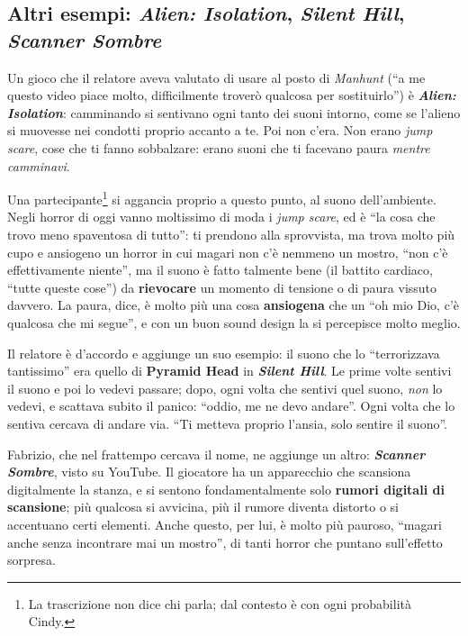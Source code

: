 \subsection{Altri esempi: \emph{Alien: Isolation}, \emph{Silent Hill},
\emph{Scanner Sombre}}

Un gioco che il relatore aveva valutato di usare al posto di \emph{Manhunt} (``a
me questo video piace molto, difficilmente troverò qualcosa per sostituirlo'') è
\textbf{\emph{Alien: Isolation}}: camminando si sentivano ogni tanto dei suoni
intorno, come se l'alieno si muovesse nei condotti proprio accanto a te. Poi non
c'era. Non erano \emph{jump scare}, cose che ti fanno sobbalzare: erano suoni
che ti facevano paura \emph{mentre camminavi}.

Una partecipante\footnote{La trascrizione non dice chi parla; dal contesto è con
ogni probabilità Cindy.} si aggancia proprio a questo punto, al suono
dell'ambiente. Negli horror di oggi vanno moltissimo di moda i \emph{jump scare},
ed è ``la cosa che trovo meno spaventosa di tutto'': ti prendono alla sprovvista,
ma trova molto più cupo e ansiogeno un horror in cui magari non c'è nemmeno un
mostro, ``non c'è effettivamente niente'', ma il suono è fatto talmente bene
(il battito cardiaco, ``tutte queste cose'') da \textbf{rievocare} un momento di
tensione o di paura vissuto davvero. La paura, dice, è molto più una cosa
\textbf{ansiogena} che un ``oh mio Dio, c'è qualcosa che mi segue'', e con un
buon sound design la si percepisce molto meglio.

Il relatore è d'accordo e aggiunge un suo esempio: il suono che lo
``terrorizzava tantissimo'' era quello di \textbf{Pyramid Head} in
\textbf{\emph{Silent Hill}}. Le prime volte sentivi il suono e poi lo vedevi
passare; dopo, ogni volta che sentivi quel suono, \emph{non} lo vedevi, e scattava
subito il panico: ``oddio, me ne devo andare''. Ogni volta che lo sentiva cercava
di andare via. ``Ti metteva proprio l'ansia, solo sentire il suono''.

Fabrizio, che nel frattempo cercava il nome, ne aggiunge un altro:
\textbf{\emph{Scanner Sombre}}, visto su YouTube. Il giocatore ha un apparecchio
che scansiona digitalmente la stanza, e si sentono fondamentalmente solo
\textbf{rumori digitali di scansione}; più qualcosa si avvicina, più il rumore
diventa distorto o si accentuano certi elementi. Anche questo, per lui, è molto
più pauroso, ``magari anche senza incontrare mai un mostro'', di tanti horror che
puntano sull'effetto sorpresa.

